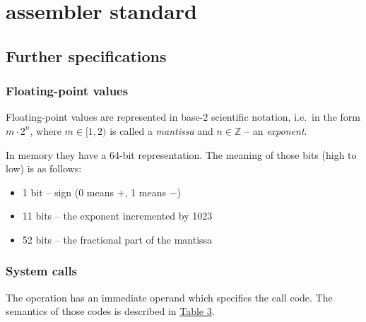 \section{ assembler standard}


\newpage


\newpage

\subsection{Further specifications}

\hypertarget{float:storage}{}

\subsubsection{Floating-point values}

Floating-point values are represented in base-2 scientific notation, i.e.\ in the form $m\cdot 2^n$, \newline
where $m\in [1, 2)$ is called a \textit{mantissa} and $n\in \mathbb{Z}$ -- an \textit{exponent}.

In memory they have a 64-bit representation.
The meaning of those bits (high to low) is as follows:

\begin{itemize}
    \item 1 bit -- sign (0 means $+$, 1 means $-$)
    \item 11 bits -- the exponent incremented by 1023
    \item 52 bits -- the fractional part of the mantissa
\end{itemize}

\hypertarget{syscall:details}{}

\subsubsection{System calls}

The \hyperlink{syscall}{} operation has an immediate operand which specifies the call code.
The semantics of those codes is described in \hyperlink{syscall:codes}{Table 3}.


